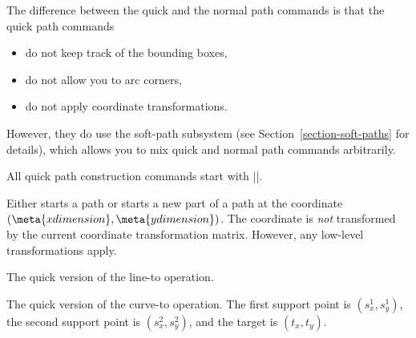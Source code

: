 The difference between the quick and the normal path commands is that the quick
path commands
%
\begin{itemize}
    \item do not keep track of the bounding boxes,
    \item do not allow you to arc corners,
    \item do not apply coordinate transformations.
\end{itemize}

However, they do use the soft-path subsystem (see
Section~\ref{section-soft-paths} for details), which allows you to mix quick
and normal path commands arbitrarily.

All quick path construction commands start with |\pgfpathq|.

\begin{command}{\pgfpathqmoveto{}}
    Either starts a path or starts a new part of a path at the coordinate
    $(\meta{x dimension},\meta{y dimension})$. The coordinate is \emph{not}
    transformed by the current coordinate transformation matrix. However, any
    low-level transformations apply.
\begin{codeexample}[]
\end{codeexample}
\end{command}

\begin{command}{\pgfpathqlineto{}}
    The quick version of the line-to operation.
\end{command}

\begin{command}{\pgfpathqcurveto{}}
    The quick version of the curve-to operation. The first support point is
    $(s^1_x,s^1_y)$, the second support point is  $(s^2_x,s^2_y)$, and the
    target is $(t_x,t_y)$.
\begin{codeexample}[]
\end{codeexample}
\end{command}

